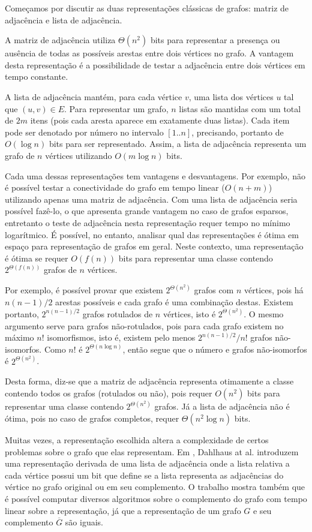 Começamos por discutir as duas representações clássicas de grafos: matriz de adjacência e lista de adjacência. 

A matriz de adjacência utiliza $\Theta(n^2)$ bits para representar a presença ou ausência de todas as possíveis arestas entre dois vértices no grafo. A vantagem desta representação é a possibilidade de testar a adjacência entre dois vértices em tempo constante.

A lista de adjacência mantém, para cada vértice $v$, uma lista dos vértices $u$ tal que $(u, v) \in E$. Para representar um grafo, $n$ listas são mantidas com um total de $2m$ itens (pois cada aresta aparece em exatamente duas listas). Cada item pode ser denotado por número no intervalo $[1..n]$, precisando, portanto de $O(\log n)$ bits para ser representado. Assim, a lista de adjacência representa um grafo de $n$ vértices utilizando $O(m \log n)$ bits.

Cada uma dessas representações tem vantagens e desvantagens. Por exemplo, não é possível testar a conectividade do grafo em tempo linear ($O(n + m)$) utilizando apenas uma matriz de adjacência. Com uma lista de adjacência seria possível fazê-lo, o que apresenta grande vantagem no caso de grafos esparsos, entretanto o teste de adjacência nesta representação requer tempo no mínimo logarítmico. É possível, no entanto, analisar qual das representações é ótima em espaço para representação de grafos em geral. Neste contexto, uma representação é ótima se requer $O(f(n))$ bits para representar uma classe contendo $2^{\Theta(f(n))}$ grafos de $n$ vértices.

Por exemplo, é possível provar que existem $2^{\Theta(n^2)}$ grafos com $n$ vértices, pois há $n (n-1)/2$ arestas possíveis e cada grafo é uma combinação destas. Existem portanto, $2^{n (n-1) / 2}$ grafos rotulados de $n$ vértices, isto é $2^{\Theta(n^2)}$. O mesmo argumento serve para grafos não-rotulados, pois para cada grafo existem no máximo $n!$ isomorfismos, isto é, existem pelo menos $2^{n (n-1) / 2} / n!$ grafos não-isomorfos. Como $n!$ é $2^{\Theta(n \log n)}$, então segue que o número e grafos não-isomorfos é $2^{\Theta(n^2)}$.

Desta forma, diz-se que a matriz de adjacência representa otimamente a classe contendo todos os grafos (rotulados ou não), pois requer $O(n^2)$ bits para representar uma classe contendo $2^{\Theta({n^2})}$ grafos. Já a lista de adjacência não é ótima, pois no caso de grafos completos, requer $\Theta(n^2 \log n)$ bits.

Muitas vezes, a representação escolhida altera a complexidade de certos problemas sobre o grafo que elas representam. Em \cite{dahlhaus2002partially}, Dahlhaus at al. introduzem uma representação derivada de uma lista de adjacência onde a lista relativa a cada vértice possui um bit que define se a lista representa as adjacências do vértice no grafo original ou em seu complemento. O trabalho mostra também que é possível computar diversos algoritmos sobre o complemento do grafo com tempo linear sobre a representação, já que a representação de um grafo $G$ e seu complemento $\overline{G}$ são iguais.

